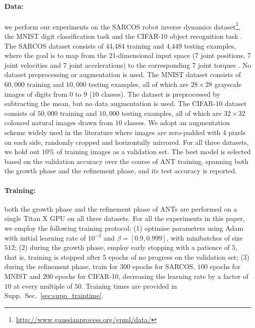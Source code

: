 \paragraph{Data:} we perform our experiments on the SARCOS robot inverse dynamics dataset\footnote{\url{http://www.gaussianprocess.org/gpml/data/}}, the MNIST digit classification task \citep{lecun1998gradient} and the CIFAR-10 object recognition task \citep{krizhevsky2009learning}. The SARCOS dataset consists of 44,484 training and 4,449 testing examples, where the goal is to map from the 21-dimensional input space (7 joint positions, 7 joint velocities and 7 joint accelerations) to the corresponding 7 joint torques \citep{vijayakumar2000locally}. No dataset preprocessing or augmentation is used. The MNIST dataset consists of $60,000$ training and $10,000$ testing examples, all of which are $28\times28$ grayscale images of digits from $0$ to $9$ ($10$ classes). The dataset is preprocessed by subtracting the mean, but no data augmentation is used. The CIFAR-10 dataset consists of $50,000$ training and $10,000$ testing examples, all of which are $32\times32$ coloured natural images drawn from $10$ classes. We adopt an augmentation scheme widely used in the literature \citep{goodfellow2013maxout,lin2013network,springenberg2014striving,he2016deep,huang2017densely} where images are zero-padded with 4 pixels on each side, randomly cropped and horizontally mirrored. For all three datasets, we hold out $10\%$ of training images as a validation set. The best model is selected based on the validation accuracy over the course of ANT training, spanning both the growth phase and the refinement phase, and its test accuracy is reported. 

\vspace{-5mm}
\paragraph{Training:} both the growth phase and the refinement phase of ANTs are performed on a single Titan X GPU on all three datasets. For all the experiments in this paper, we employ the following training protocol: (1) optimise parameters using Adam \citep{kingma2014adam} with initial learning rate of $10^{-3}$ and $\beta = [0.9, 0.999]$, with minibatches of size $512$; (2) during the growth phase, employ early stopping with a patience of $5$, that is, training is stopped after 5 epochs of no progress on the validation set; (3) during the refinement phase, train for $300$ epochs for SARCOS, $100$ epochs for MNIST and $200$ epochs for CIFAR-10, decreasing the learning rate by a factor of $10$ at every multiple of $50$. Training times are provided in Supp.~Sec.~\ref{sec:supp_traintime}.  

